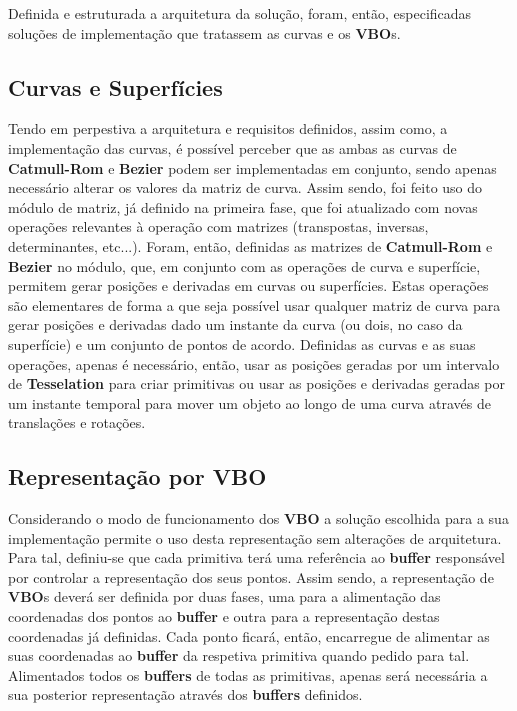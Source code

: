 Definida e estruturada a arquitetura da solução, foram, então,
especificadas soluções de implementação que tratassem as curvas
e os \textbf{VBO}s.

\subsection{Curvas e Superfícies}

Tendo em perpestiva a arquitetura e requisitos definidos,
assim como, a implementação das curvas, é possível perceber
que as ambas as curvas de \textbf{Catmull-Rom} e \textbf{Bezier}
podem ser implementadas em conjunto, sendo apenas necessário
alterar os valores da matriz de curva.
\newline
\break
\noindent
Assim sendo, foi feito uso do módulo de matriz, já definido na
primeira fase, que foi atualizado com novas operações relevantes
à operação com matrizes (transpostas, inversas, determinantes, etc...). 
\newline
\break
\noindent
Foram, então, definidas as matrizes de \textbf{Catmull-Rom} e \textbf{Bezier}
no módulo, que, em conjunto com as operações de curva e superfície, permitem
gerar posições e derivadas em curvas ou superfícies.
\newline
\break
\noindent
Estas operações são elementares de forma a que seja possível usar qualquer matriz de
curva para gerar posições e derivadas dado um instante da curva (ou dois, no caso da superfície)
e um conjunto de pontos de acordo.
\newline
\break
\noindent
Definidas as curvas e as suas operações, apenas é necessário, então, usar as posições
geradas por um intervalo de \textbf{Tesselation} para criar primitivas ou usar as
posições e derivadas geradas por um instante temporal para mover um objeto ao longo
de uma curva através de translações e rotações.

\subsection{Representação por VBO}

Considerando o modo de funcionamento dos \textbf{VBO} a solução escolhida para
a sua implementação permite o uso desta representação sem alterações de arquitetura.
\newline
\break
\noindent
Para tal, definiu-se que cada primitiva terá uma referência ao \textbf{buffer} responsável
por controlar a representação dos seus pontos.
\newline
\break
\noindent
Assim sendo, a representação de \textbf{VBO}s deverá ser definida por duas fases, uma para 
a alimentação das coordenadas dos pontos ao \textbf{buffer} e outra para a representação
destas coordenadas já definidas.
\newline
\break
\noindent
Cada ponto ficará, então, encarregue de alimentar as suas coordenadas ao \textbf{buffer}
da respetiva primitiva quando pedido para tal.
\newline
\break
\noindent
Alimentados todos os \textbf{buffers} de todas as primitivas, apenas será necessária a
sua posterior representação através dos \textbf{buffers} definidos.